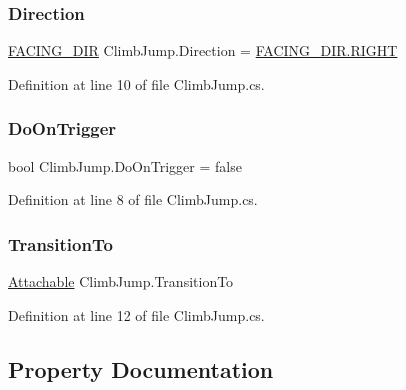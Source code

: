 \mbox{\label{class_climb_jump_aba36d59845979b06dc89df544064a284}} 
\subsubsection{\texorpdfstring{Direction}{Direction}}
{\footnotesize\ttfamily \mbox{\hyperlink{_animal_8cs_a57d10208ebba781ae206546ada2002b6}{F\+A\+C\+I\+N\+G\+\_\+\+D\+IR}} Climb\+Jump.\+Direction = \mbox{\hyperlink{_animal_8cs_a57d10208ebba781ae206546ada2002b6a21507b40c80068eda19865706fdc2403}{F\+A\+C\+I\+N\+G\+\_\+\+D\+I\+R.\+R\+I\+G\+HT}}}



Definition at line 10 of file Climb\+Jump.\+cs.

\mbox{\label{class_climb_jump_a1a5693023b987aa23829b8a0377d9dc2}} 
\subsubsection{\texorpdfstring{Do\+On\+Trigger}{DoOnTrigger}}
{\footnotesize\ttfamily bool Climb\+Jump.\+Do\+On\+Trigger = false}



Definition at line 8 of file Climb\+Jump.\+cs.

\mbox{\label{class_climb_jump_a1828a3600e286c5563ff59966bdc5ee3}} 
\subsubsection{\texorpdfstring{Transition\+To}{TransitionTo}}
{\footnotesize\ttfamily \mbox{\hyperlink{class_attachable}{Attachable}} Climb\+Jump.\+Transition\+To}



Definition at line 12 of file Climb\+Jump.\+cs.



\subsection{Property Documentation}
\mbox{\label{class_climb_jump_a794d5397520c8d0420f6e1bd7a1c5ae8}} 
